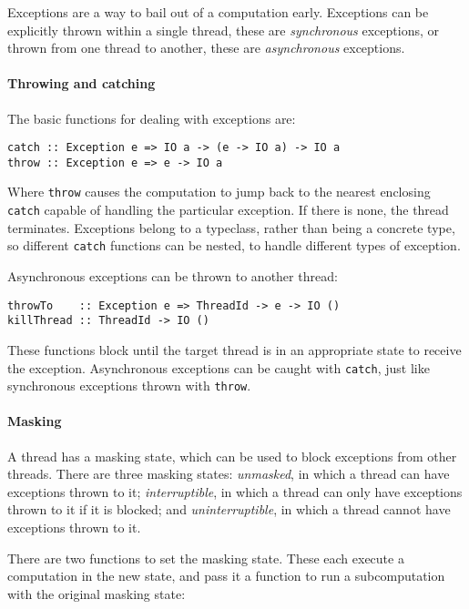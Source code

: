 Exceptions are a way to bail out of a computation early.  Exceptions can be
explicitly thrown within a single thread, these are \emph{synchronous}
exceptions, or thrown from one thread to another, these are \emph{asynchronous}
exceptions.

\paragraph{Throwing and catching}
The basic functions for dealing with exceptions are:

\begin{verbatim}
catch :: Exception e => IO a -> (e -> IO a) -> IO a
throw :: Exception e => e -> IO a
\end{verbatim}

Where \verb|throw| causes the computation to jump back to the nearest
enclosing \verb|catch| capable of handling the particular exception.
If there is none, the thread terminates.  Exceptions belong to a
typeclass, rather than being a concrete type, so different
\verb|catch| functions can be nested, to handle different types of
exception.

Asynchronous exceptions can be thrown to another thread:

\begin{verbatim}
throwTo    :: Exception e => ThreadId -> e -> IO ()
killThread :: ThreadId -> IO ()
\end{verbatim}

These functions block until the target thread is in an appropriate state to
receive the exception.  Asynchronous exceptions can be caught with \verb|catch|,
just like synchronous exceptions thrown with \verb|throw|.

\paragraph{Masking}
A thread has a masking state, which can be used to block exceptions
from other threads.  There are three masking states: \emph{unmasked},
in which a thread can have exceptions thrown to it;
\emph{interruptible}, in which a thread can only have exceptions
thrown to it if it is blocked; and \emph{uninterruptible}, in which a
thread cannot have exceptions thrown to it.

There are two functions to set the masking state.  These each execute a
computation in the new state, and pass it a function to run a subcomputation
with the original masking state:

